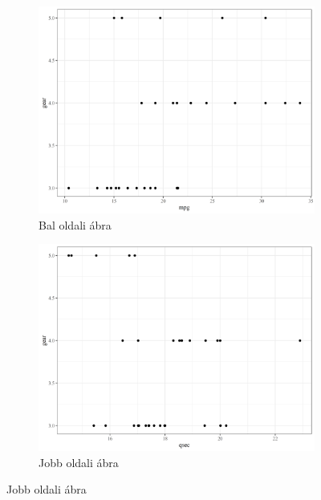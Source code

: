 \documentclass[]{elsarticle} %
\begin{document}
\begin{figure}[h]
\begin{multicols}{2}
\begin{figure}[H]
\includegraphics[width = \linewidth]{cookbook_files/figure-latex/gear-fig1-1}
\caption{Bal oldali ábra}
\label{fig:bar2_a4}
\end{figure}

\columnbreak

\begin{figure}[H]
\includegraphics[width = \linewidth]{cookbook_files/figure-latex/gear-fig1-2}
\centering
\caption{Jobb oldali ábra}
\label{fig:bar2_b4}
\end{figure}
\end{multicols}
\end{figure}
\end{document}
